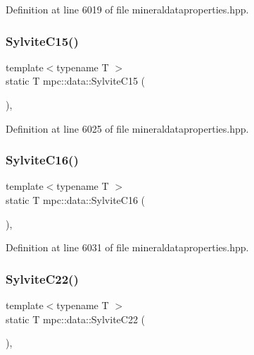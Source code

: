 Definition at line 6019 of file mineraldataproperties.\+hpp.

\mbox{\label{namespacempc_1_1data_a1de255b4e2e27b705c03c4ef1e66a00c}} 
\subsubsection{\texorpdfstring{Sylvite\+C15()}{SylviteC15()}}
{\footnotesize\ttfamily template$<$typename T $>$ \\
static T mpc\+::data\+::\+Sylvite\+C15 (\begin{DoxyParamCaption}{ }\end{DoxyParamCaption})\hspace{0.3cm}{\ttfamily [inline]}, {\ttfamily [static]}}



Definition at line 6025 of file mineraldataproperties.\+hpp.

\mbox{\label{namespacempc_1_1data_abf4e46aaa20d02f8799134c42101ef41}} 
\subsubsection{\texorpdfstring{Sylvite\+C16()}{SylviteC16()}}
{\footnotesize\ttfamily template$<$typename T $>$ \\
static T mpc\+::data\+::\+Sylvite\+C16 (\begin{DoxyParamCaption}{ }\end{DoxyParamCaption})\hspace{0.3cm}{\ttfamily [inline]}, {\ttfamily [static]}}



Definition at line 6031 of file mineraldataproperties.\+hpp.

\mbox{\label{namespacempc_1_1data_ac6ff9f0173c5719b2b12930525016c12}} 
\subsubsection{\texorpdfstring{Sylvite\+C22()}{SylviteC22()}}
{\footnotesize\ttfamily template$<$typename T $>$ \\
static T mpc\+::data\+::\+Sylvite\+C22 (\begin{DoxyParamCaption}{ }\end{DoxyParamCaption})\hspace{0.3cm}{\ttfamily [inline]}, {\ttfamily [static]}}



